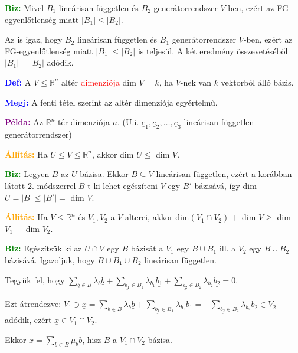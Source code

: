 \documentclass[../szamtud.tex]{subfiles}
\begin{document}
        \textcolor{green}{\textbf{Biz:}} Mivel $B_1$ lineárisan független és $B_2$ generátorrendszer $V$-ben, ezért az FG-egyenlőtlenség miatt $|B_1| \leq |B_2|$. 

        Az is igaz, hogy $B_2$ lineárisan független és $B_1$ generátorrendszer $V$-ben, ezért az FG-egyenlőtlenség miatt $|B_1| \leq |B_2|$ is teljesül. A két  eredmény összevetéséből $|B_1| = |B_2|$ adódik.

        \textcolor{blue}{\textbf{Def:}} A $V \leq \mathbb{R}^n$ altér \textcolor{red}{dimenziója} dim $V = k$, ha $V$-nek van $k$ vektorból álló bázis.

        \textcolor{blue}{\textbf{Megj:}} A fenti tétel szerint az altér dimenziója egyértelmű.

        \textcolor{purple}{\textbf{Példa:}} Az $\mathbb{R}^n$ tér dimenziója $n$. (U.i. $\underline{e}_1, \underline{e}_2, \dots, \underline{e}_3$ lineárisan független generátorrendszer)

        \textcolor{orange}{\textbf{Állítás:}} Ha $U \leq V \leq \mathbb{R}^n$, akkor dim $U \leq$ dim $V$.

        \textcolor{green}{\textbf{Biz:}} Legyen $B$ az $U$ bázisa. Ekkor $B \subseteq V$ lineárisan független, ezért a korábban látott 2. módszerrel $B$-t ki lehet egészíteni $V$ egy $B'$ bázisává, így dim $U = |B| \leq |B'| = $ dim $V$.

        \textcolor{orange}{\textbf{Állítás:}} Ha $V \leq \mathbb{R}^n$ és $V_1, V_2$ a $V$ alterei, akkor dim$(V_1 \cap V_2) +$ dim $V \geq$ dim $V_1 +$ dim $V_2$.

        \textcolor{green}{\textbf{Biz:}} Egészítsük ki az $U \cap V$ egy $B$ bázisát a $V_1$ egy $B \cup B_1$ ill. a $V_2$ egy $B \cup B_2$ bázisává. Igazoljuk, hogy $B \cup B_1 \cup B_2$ lineárisan független. 
        
        \noindent Tegyük fel, hogy $\sum_{\underline{b} \in B} \lambda_b \underline{b} + \sum_{\underline{b_1} \in B_1} \lambda_{b_1} \underline{b_1} + \sum_{\underline{b_2} \in B_2} \lambda_{b_2} \underline{b_2} = 0$. 
        
        \noindent Ezt átrendezve: $V_1 \ni \underline{x} = \sum_{\underline{b} \in B} \lambda_b \underline{b} + \sum_{\underline{b_1} \in B_1} \lambda_{b_1} \underline{b_1} = -\sum_{\underline{b_2} \in B_2} \lambda_{b_2} \underline{b_2} \in V_2$ adódik, ezért $\underline{x} \in V_1 \cap V_2$. 
        
        \noindent Ekkor $\underline{x} = \sum_{\underline{b} \in B} \mu_b \underline{b}$, hisz $B$ a $V_1 \cap V_2$ bázisa. 
        
\end{document}
